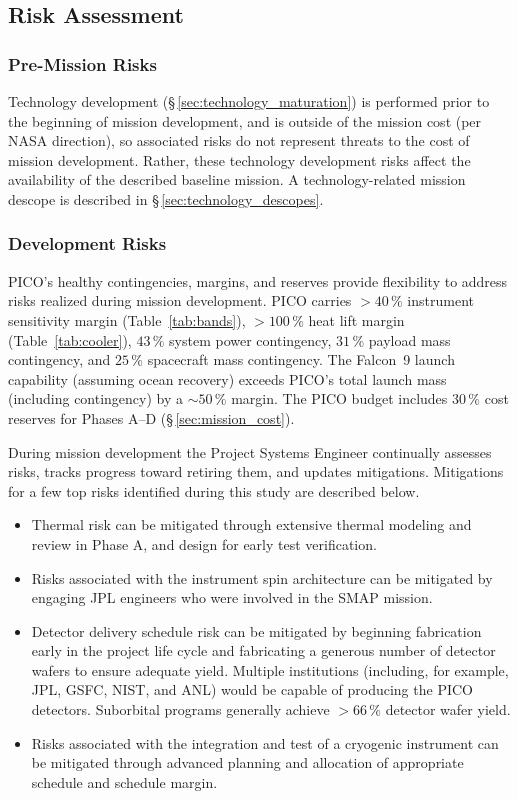 \subsection{Risk Assessment}
\label{sec:risk_assessment} %

\subsubsection{Pre-Mission Risks}
\label{sec:premission_risks} %

Technology development (\S\,\ref{sec:technology_maturation}) is
performed prior to the beginning of mission development, and is
outside of the mission cost (per NASA direction), so associated risks
do not represent threats to the cost of mission development. Rather,
these technology development risks affect 
the availability of the described baseline
mission. A technology-related mission descope is described in
\S\,\ref{sec:technology_descopes}.

\subsubsection{Development Risks}
\label{sec:development_risks} %

PICO's healthy contingencies, margins, and reserves provide
flexibility to address risks realized during mission development. PICO
carries $>40\,\%$ instrument sensitivity margin (Table~\ref{tab:bands}),
$>100\,\%$ heat lift margin (Table~\ref{tab:cooler}), $43\,\%$ system
power contingency, $31\,\%$ payload mass contingency, and $25\,\%$
spacecraft mass contingency. The Falcon~9 launch capability (assuming ocean
recovery) exceeds PICO's total launch mass (including contingency) by
a $\sim 50\,\%$ margin. The PICO budget includes $30\,\%$ cost
reserves for Phases A--D (\S\,\ref{sec:mission_cost}).

During mission development the Project Systems Engineer continually
assesses risks, tracks progress toward retiring them, and updates
mitigations. Mitigations for a few top risks identified during this
study are described below.
\begin{itemize}
\item Thermal risk can be mitigated through extensive thermal modeling and
review in Phase A, and design for early test verification. 
\item Risks
associated with the instrument spin architecture can be mitigated by
engaging JPL engineers who were involved in the SMAP mission.
\item  Detector
delivery schedule risk can be mitigated by beginning fabrication early
in the project life cycle and fabricating a generous number of
detector wafers to ensure adequate yield. Multiple institutions (including, for example, JPL, GSFC, NIST, and ANL) would be capable of producing the PICO detectors. Suborbital programs generally achieve $>66\,\%$ detector wafer yield.
\item Risks associated with the
integration and test of a cryogenic instrument can be mitigated
through advanced planning and allocation of appropriate schedule and
schedule margin.
\end{itemize}

